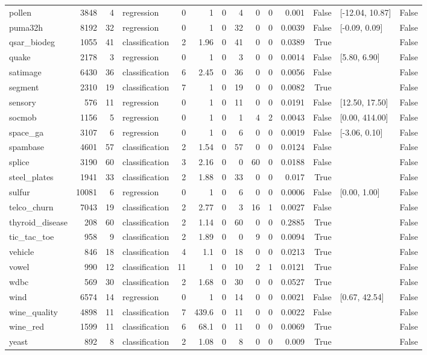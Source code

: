 \begin{table}
\begin{tabular}{lrrlrrrrrrrrlr}
pollen & 3848 & 4 & regression & 0 & 1 & 0 & 4 & 0 & 0 & 0.001 & False & [-12.04, 10.87] & False \\
puma32h & 8192 & 32 & regression & 0 & 1 & 0 & 32 & 0 & 0 & 0.0039 & False & [-0.09, 0.09] & False \\
qsar\_biodeg & 1055 & 41 & classification & 2 & 1.96 & 0 & 41 & 0 & 0 & 0.0389 & True &  & False \\
quake & 2178 & 3 & regression & 0 & 1 & 0 & 3 & 0 & 0 & 0.0014 & False & [5.80, 6.90] & False \\
satimage & 6430 & 36 & classification & 6 & 2.45 & 0 & 36 & 0 & 0 & 0.0056 & False &  & False \\
segment & 2310 & 19 & classification & 7 & 1 & 0 & 19 & 0 & 0 & 0.0082 & True &  & False \\
sensory & 576 & 11 & regression & 0 & 1 & 0 & 11 & 0 & 0 & 0.0191 & False & [12.50, 17.50] & False \\
socmob & 1156 & 5 & regression & 0 & 1 & 0 & 1 & 4 & 2 & 0.0043 & False & [0.00, 414.00] & False \\
space\_ga & 3107 & 6 & regression & 0 & 1 & 0 & 6 & 0 & 0 & 0.0019 & False & [-3.06, 0.10] & False \\
spambase & 4601 & 57 & classification & 2 & 1.54 & 0 & 57 & 0 & 0 & 0.0124 & False &  & False \\
splice & 3190 & 60 & classification & 3 & 2.16 & 0 & 0 & 60 & 0 & 0.0188 & False &  & False \\
steel\_plates & 1941 & 33 & classification & 2 & 1.88 & 0 & 33 & 0 & 0 & 0.017 & True &  & False \\
sulfur & 10081 & 6 & regression & 0 & 1 & 0 & 6 & 0 & 0 & 0.0006 & False & [0.00, 1.00] & False \\
telco\_churn & 7043 & 19 & classification & 2 & 2.77 & 0 & 3 & 16 & 1 & 0.0027 & False &  & False \\
thyroid\_disease & 208 & 60 & classification & 2 & 1.14 & 0 & 60 & 0 & 0 & 0.2885 & True &  & False \\
tic\_tac\_toe & 958 & 9 & classification & 2 & 1.89 & 0 & 0 & 9 & 0 & 0.0094 & True &  & False \\
vehicle & 846 & 18 & classification & 4 & 1.1 & 0 & 18 & 0 & 0 & 0.0213 & True &  & False \\
vowel & 990 & 12 & classification & 11 & 1 & 0 & 10 & 2 & 1 & 0.0121 & True &  & False \\
wdbc & 569 & 30 & classification & 2 & 1.68 & 0 & 30 & 0 & 0 & 0.0527 & True &  & False \\
wind & 6574 & 14 & regression & 0 & 1 & 0 & 14 & 0 & 0 & 0.0021 & False & [0.67, 42.54] & False \\
wine\_quality & 4898 & 11 & classification & 7 & 439.6 & 0 & 11 & 0 & 0 & 0.0022 & False &  & False \\
wine\_red & 1599 & 11 & classification & 6 & 68.1 & 0 & 11 & 0 & 0 & 0.0069 & True &  & False \\
yeast & 892 & 8 & classification & 2 & 1.08 & 0 & 8 & 0 & 0 & 0.009 & True &  & False \\
\bottomrule
\end{tabular}
\end{table}
